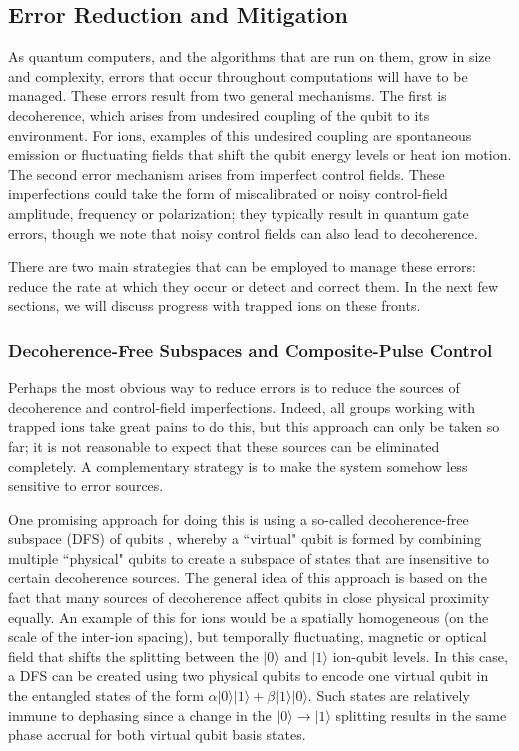 \documentclass[%
reprint,
 amsmath,amssymb,
]{revtex4-1}
\newcommand{\zero}{|0 \rangle}
\newcommand{\one}{|1 \rangle}
\begin{document}
\subsection{Error Reduction and Mitigation}
\label{ErrorReducandMit}
As quantum computers, and the algorithms that are run on them, grow in size and complexity, errors that occur throughout computations will have to be managed.  These errors result from two general mechanisms.  The first is decoherence, which arises from undesired coupling of the qubit to its environment.  For ions, examples of this undesired coupling are spontaneous emission or fluctuating fields that shift the qubit energy levels or heat ion motion.  The second error mechanism arises from imperfect control fields.  These imperfections could take the form of miscalibrated or noisy control-field amplitude, frequency or polarization; they typically result in quantum gate errors, though we note that noisy control fields can also lead to decoherence.

There are two main strategies that can be employed to manage these errors: reduce the rate at which they occur or detect and correct them.  In the next few sections, we will discuss progress with trapped ions on these fronts.

\subsubsection{Decoherence-Free Subspaces and Composite-Pulse Control}
\label{DFS}
Perhaps the most obvious way to reduce errors is to reduce the sources of decoherence and control-field imperfections.  Indeed, all groups working with trapped ions take great pains to do this, but this approach can only be taken so far; it is not reasonable to expect that these sources can be eliminated completely.  A complementary strategy is to make the system somehow less sensitive to error sources.

One promising approach for doing this is using a so-called decoherence-free subspace (DFS) of qubits \cite{LidarDFS1998, ZanardiDFS1997, DuanDFS1998}, whereby a ``virtual" qubit \cite{JonesQCArchitecture2012} is formed by combining multiple ``physical" qubits to create a subspace of states that are insensitive to certain decoherence sources.  The general idea of this approach is based on the fact that many sources of decoherence affect qubits in close physical proximity equally.  An example of this for ions would be a spatially homogeneous (on the scale of the inter-ion spacing), but temporally fluctuating, magnetic or optical field that shifts the splitting between the $\zero$ and $\one$ ion-qubit levels.  In this case, a DFS can be created using two physical qubits to encode one virtual qubit in the entangled states of the form $\alpha\zero\one+\beta\one\zero$.  Such states are relatively immune to dephasing since a change in the $\zero\rightarrow\one$ splitting results in the same phase accrual for both virtual qubit basis states.
\end{document}
